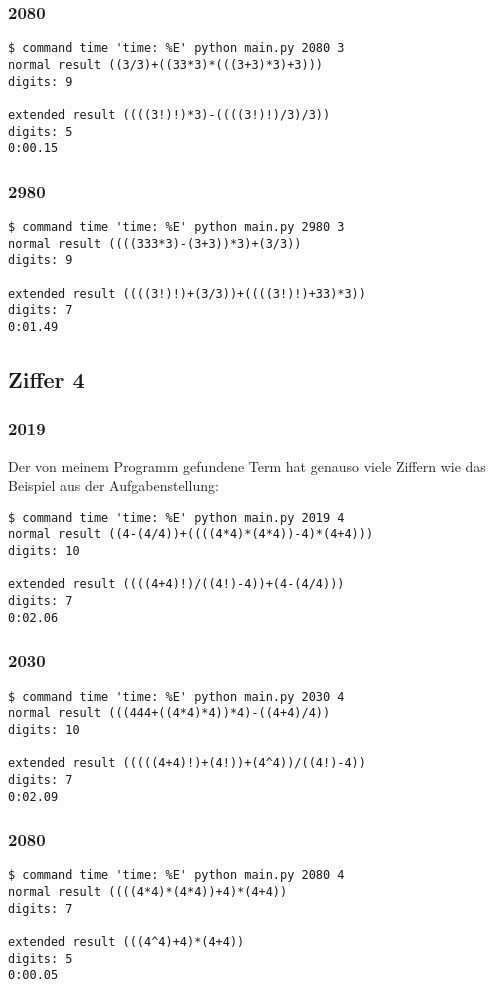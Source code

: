 \subsubsection{2080}
\begin{lstlisting}
$ command time 'time: %E' python main.py 2080 3
normal result ((3/3)+((33*3)*(((3+3)*3)+3)))
digits: 9

extended result ((((3!)!)*3)-((((3!)!)/3)/3))
digits: 5
0:00.15
\end{lstlisting}
\subsubsection{2980}
\begin{lstlisting}
$ command time 'time: %E' python main.py 2980 3
normal result ((((333*3)-(3+3))*3)+(3/3))
digits: 9

extended result ((((3!)!)+(3/3))+((((3!)!)+33)*3))
digits: 7
0:01.49
\end{lstlisting}
\subsection{Ziffer 4}
\subsubsection{2019}
Der von meinem Programm gefundene Term hat genauso viele Ziffern wie das Beispiel aus der Aufgabenstellung:
\begin{lstlisting}
$ command time 'time: %E' python main.py 2019 4
normal result ((4-(4/4))+((((4*4)*(4*4))-4)*(4+4)))
digits: 10

extended result ((((4+4)!)/((4!)-4))+(4-(4/4)))
digits: 7
0:02.06
\end{lstlisting}
\subsubsection{2030}
\begin{lstlisting}
$ command time 'time: %E' python main.py 2030 4
normal result (((444+((4*4)*4))*4)-((4+4)/4))
digits: 10

extended result (((((4+4)!)+(4!))+(4^4))/((4!)-4))
digits: 7
0:02.09
\end{lstlisting}
\subsubsection{2080}
\begin{lstlisting}
$ command time 'time: %E' python main.py 2080 4
normal result ((((4*4)*(4*4))+4)*(4+4))
digits: 7

extended result (((4^4)+4)*(4+4))
digits: 5
0:00.05
\end{lstlisting}
